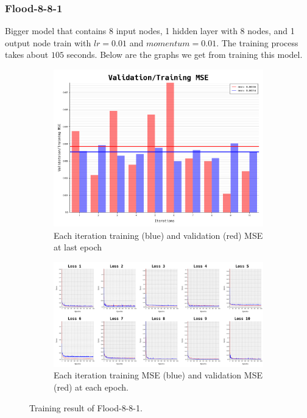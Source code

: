 \documentclass{article}
\begin{document}
\newpage
\subsubsection*{Flood-8-8-1}
Bigger model that contains 8 input nodes, 1 hidden layer with 8 nodes, and 1 output node train with $lr = 0.01$ and $momentum = 0.01$.
The training process takes about $105$ seconds.
Below are the graphs we get from training this model. 
\begin{figure}[ht]
	\begin{subfigure}{\textwidth}
		\centering
		\includegraphics[scale=0.3]{flood-8-8-1/cv_l}
		\caption{Each iteration training (blue) and validation (red) MSE at last epoch}
		\label{fig:6a}
	\end{subfigure}
	\begin{subfigure}{\textwidth}
		\includegraphics[width=\textwidth]{flood-8-8-1/loss}
		\caption{Each iteration training MSE (blue) and validation MSE (red) at each epoch.}
		\label{fig:6b}
	\end{subfigure}
	\caption{Training result of Flood-8-8-1.}
	\label{fig:6}
\end{figure}
\FloatBarrier
\end{document}
